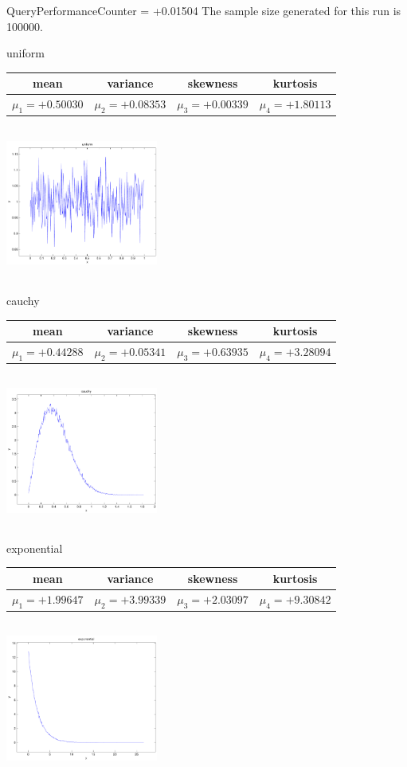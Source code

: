\documentclass[9pt]{article}
\theoremstyle{plain}
\theoremstyle{definition}
\theoremstyle{remark}
\numberwithin{equation}{section}
\begin{document}
QueryPerformanceCounter  =  +0.01504
The sample size generated for this run is 100000.

\newpage
uniform \begin{tabular}{|c|c|c|c|}  mean & variance & skewness & kurtosis \\  \hline
$\mu_1 = +0.50030$ & $\mu_2 = +0.08353$ & $\mu_3 = +0.00339$ & $\mu_4 =+1.80113$ \\
\end{tabular}

\includegraphics[width=5cm,height=5cm]{uniform.pdf}

cauchy \begin{tabular}{|c|c|c|c|}  mean & variance & skewness & kurtosis \\  \hline
$\mu_1 = +0.44288$ & $\mu_2 = +0.05341$ & $\mu_3 = +0.63935$ & $\mu_4 =+3.28094$ \\
\end{tabular}

\includegraphics[width=5cm,height=5cm]{cauchy.pdf}

exponential \begin{tabular}{|c|c|c|c|}  mean & variance & skewness & kurtosis \\  \hline
$\mu_1 = +1.99647$ & $\mu_2 = +3.99339$ & $\mu_3 = +2.03097$ & $\mu_4 =+9.30842$ \\
\end{tabular}

\includegraphics[width=5cm,height=5cm]{exponential.pdf}
\end{document}
